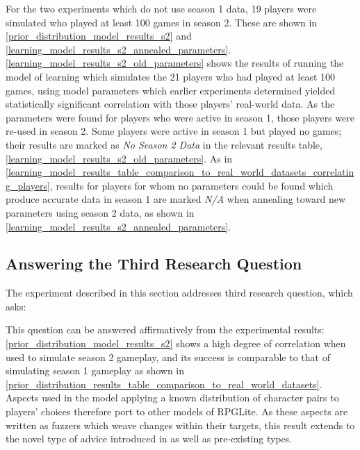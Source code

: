 For the two experiments which do not use season 1 data, 19 players were
simulated who played at least 100 games in season 2. These are shown in
\cref{prior_distribution_model_results_s2} and
\cref{learning_model_results_s2_annealed_parameters}. \cref{learning_model_results_s2_old_parameters} shows the results
of running the model of learning which simulates the 21 players who had played
at least 100 games, using model parameters which earlier experiments determined
yielded statistically significant correlation with those players' real-world
data. As the parameters were found for players who were active in season 1,
those players were re-used in season 2. Some players were active in season 1 but
played no games; their results are marked as \emph{No Season 2 Data} in the
relevant results table, \cref{learning_model_results_s2_old_parameters}. As in
\cref{learning_model_results_table_comparison_to_real_world_datasets_correlating_players},
results for players for whom no parameters could be found which produce accurate data in
season 1 are marked \emph{N/A} when annealing toward new parameters using season
2 data, as shown in \cref{learning_model_results_s2_annealed_parameters}.



\subsection{Answering the Third Research Question}

The experiment described in this section addresses third research question,
which asks:

\begin{researchquestion}
  \rqthree{}
\end{researchquestion}

This question can be answered affirmatively from the experimental
results: \cref{prior_distribution_model_results_s2} shows a high degree of
correlation when used to simulate season 2 gameplay, and its success is
comparable to that of simulating season 1 gameplay as shown in
\cref{prior_distribution_results_table_comparison_to_real_world_datasets}.
Aspects used in the model applying a known distribution of character pairs to
players' choices therefore port to other models of RPGLite. As these aspects are
written as fuzzers which weave changes within their targets, this result extends
to the novel type of advice introduced in \pdsfthree{} as well as pre-existing types.

